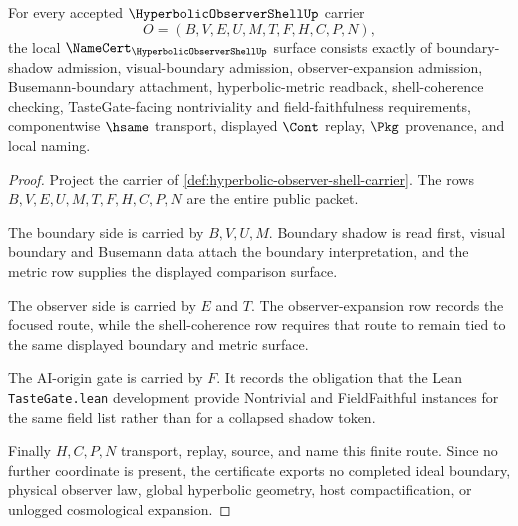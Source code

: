 \begin{theorem}
\label{thm:hyperbolic-observer-shell-namecert-obligations}
For every accepted $\HyperbolicObserverShellUp$ carrier
$$
O=(B,V,E,U,M,T,F,H,C,P,N),
$$
the local $\NameCert_{\HyperbolicObserverShellUp}$ surface consists exactly of boundary-shadow admission, visual-boundary admission, observer-expansion admission, Busemann-boundary attachment, hyperbolic-metric readback, shell-coherence checking, TasteGate-facing nontriviality and field-faithfulness requirements, componentwise $\hsame$ transport, displayed $\Cont$ replay, $\Pkg$ provenance, and local naming.
\end{theorem}
\begin{proof}
Project the carrier of \autoref{def:hyperbolic-observer-shell-carrier}. The rows $B,V,E,U,M,T,F,H,C,P,N$ are the entire public packet.

The boundary side is carried by $B,V,U,M$. Boundary shadow is read first, visual boundary and Busemann data attach the boundary interpretation, and the metric row supplies the displayed comparison surface.

The observer side is carried by $E$ and $T$. The observer-expansion row records the focused route, while the shell-coherence row requires that route to remain tied to the same displayed boundary and metric surface.

The AI-origin gate is carried by $F$. It records the obligation that the Lean \texttt{TasteGate.lean} development provide Nontrivial and FieldFaithful instances for the same field list rather than for a collapsed shadow token.

Finally $H,C,P,N$ transport, replay, source, and name this finite route. Since no further coordinate is present, the certificate exports no completed ideal boundary, physical observer law, global hyperbolic geometry, host compactification, or unlogged cosmological expansion.
\end{proof}

